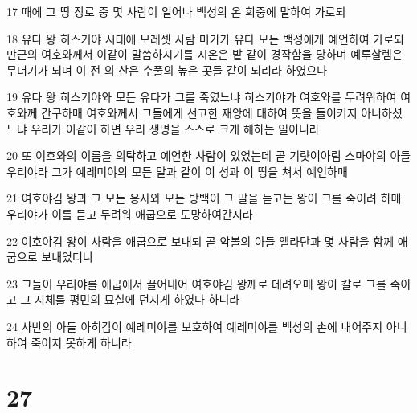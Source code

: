 \par 17 때에 그 땅 장로 중 몇 사람이 일어나 백성의 온 회중에 말하여 가로되
\par 18 유다 왕 히스기야 시대에 모레셋 사람 미가가 유다 모든 백성에게 예언하여 가로되 만군의 여호와께서 이같이 말씀하시기를 시온은 밭 같이 경작함을 당하며 예루살렘은 무더기가 되며 이 전 의 산은 수풀의 높은 곳들 같이 되리라 하였으나
\par 19 유다 왕 히스기야와 모든 유다가 그를 죽였느냐 히스기야가 여호와를 두려워하여 여호와께 간구하매 여호와께서 그들에게 선고한 재앙에 대하여 뜻을 돌이키지 아니하셨느냐 우리가 이같이 하면 우리 생명을 스스로 크게 해하는 일이니라
\par 20 또 여호와의 이름을 의탁하고 예언한 사람이 있었는데 곧 기럇여아림 스마야의 아들 우리야라 그가 예레미야의 모든 말과 같이 이 성과 이 땅을 쳐서 예언하매
\par 21 여호야김 왕과 그 모든 용사와 모든 방백이 그 말을 듣고는 왕이 그를 죽이려 하매 우리야가 이를 듣고 두려워 애굽으로 도망하여간지라
\par 22 여호야김 왕이 사람을 애굽으로 보내되 곧 악볼의 아들 엘라단과 몇 사람을 함께 애굽으로 보내었더니
\par 23 그들이 우리야를 애굽에서 끌어내어 여호야김 왕께로 데려오매 왕이 칼로 그를 죽이고 그 시체를 평민의 묘실에 던지게 하였다 하니라
\par 24 사반의 아들 아히감이 예레미야를 보호하여 예레미야를 백성의 손에 내어주지 아니하여 죽이지 못하게 하니라

\chapter{27}

